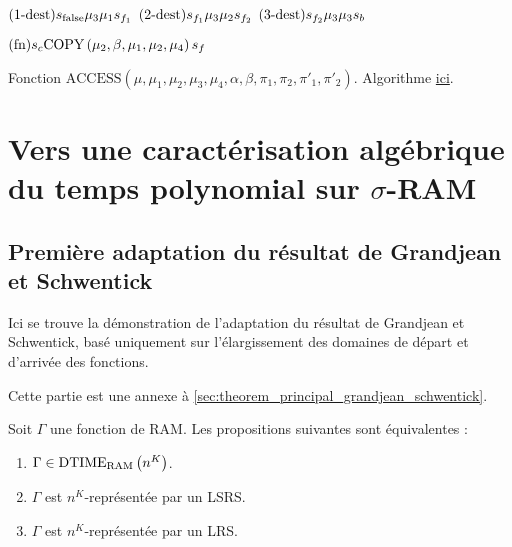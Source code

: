 \begin{appendices}
\begin{algorithm}[H]
			$\text{($1$-dest)} s_{\text{false}} \mu_3 \mu_1 s_{f_1}$ \;
			$\text{($2$-dest)} s_{f_1} \mu_3 \mu_2 s_{f_2}$ \;
			$\text{($3$-dest)} s_{f_2} \mu_3 \mu_3 s_{b}$ \;
			
			\espace 

			
			$\text{(fn)} s_{c} \text{COPY}\left( \mu_2, \beta, \mu_1, \mu_2, \mu_4 \right) s_{f}$ \;
			
			\caption{Fonction $\text{ACCESS}\left( \mu, \mu_1, \mu_2, \mu_3, \mu_4, \alpha, \beta, \pi_1, \pi_2, \pi'_1, \pi'_2\right)$. Algorithme \hyperref[algo:A_RAM_fn_ACCESS]{ici}. }
		\end{algorithm}
		
		\espace
		
		
		
		
		
		
		
		
		
	\chapter{Vers une caractérisation algébrique du temps polynomial sur $\sigma$-RAM}
		\label{chap:LSRS}
		
		\section{Première adaptation du résultat de Grandjean et Schwentick}
		\label{sec:LRS_et_temps_poly}
		
		Ici se trouve la démonstration de l'adaptation du résultat de Grandjean et Schwentick, basé uniquement sur l'élargissement des domaines de départ et d'arrivée des fonctions.
		
		Cette partie est une annexe à \ref{sec:theorem_principal_grandjean_schwentick}.
		
		\begin{conj}
			\label{conj:big_theorem}
			Soit $\Gamma$ une fonction de RAM. Les propositions suivantes sont équivalentes :
			
			\begin{enumerate}[itemsep=-1mm]
				\item 	\label{num:gamma_in_nk}
				$\Gamma \in \text{DTIME}_{\text{RAM}}\left( n^{K} \right)$.
				
				\item 	\label{num:gamma_nk_rep_LSRS}
				$\Gamma$ est $n^K$-représentée par un LSRS.
				
				\item	\label{num:gamma_nk_rep_LRS}
				$\Gamma$ est $n^K$-représentée par un LRS.
			\end{enumerate}
		\end{conj}
		

\end{appendices}
